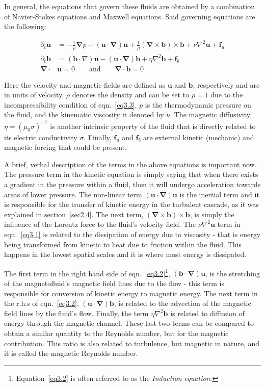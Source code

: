 \documentclass[12pt,a4paper]{report}
\begin{document}
In general, the equations that govern these fluids are obtained by a combination of Navier-Stokes equations and Maxwell equations. Said governing equations are the following:

\begin{align}
\partial_t \bm u &= - \frac{1}{\rho} \bm \nabla p - (\bm u \cdot \bm \nabla) \bm u + \frac{1}{\rho} (\bm \nabla \times \bm b) \times \bm b + \nu \nabla^2 \bm u + \bm f_u \label{eq3.1} \\
\partial_t \bm b &= (\bm b \cdot \nabla) \bm u - (\bm u \cdot \bm \nabla) \bm b + \eta \nabla^2 \bm b + \bm f_b \label{eq3.2} \\
\bm \nabla \cdot &\bm u = 0 \qquad \text{and} \qquad \bm \nabla \cdot \bm b = 0 \label{eq3.3}
\end{align}

Here the velocity and magnetic fields are defined as $\bm u$ and $\bm b$, respectively and are in units of velocity, $\rho$ denotes the density and can be set to $\rho = 1$ due to the incompressibility condition of eqn.~\ref{eq3.3}, $p$ is the thermodynamic pressure on the fluid, and the kinematic viscosity it denoted by $\nu$. The magnetic diffusivity $\eta=(\mu_0\sigma)^{-1}$ is another intrinsic property of the fluid that is directly related to its electric conductivity $\sigma$. Finally, $\bm f_u$ and $\bm f_b$ are external kinetic (mechanic) and magnetic forcing that could be present. 

A brief, verbal description of the terms in the above equations is important now. The pressure term in the kinetic equation is simply saying that when there exists a gradient in the pressure within a fluid, then it will undergo acceleration towards areas of lower pressure. The non-linear term $(\bm u \cdot \bm \nabla)\bm u$ is the inertial term and it is responsible for the transfer of kinetic energy in the turbulent cascade, as it was explained in section~\ref{sec2.4}. The next term, $(\bm \nabla \times \bm b) \times \bm b$, is simply the influence of the Lorentz force to the fluid's velocity field. The $\nu \nabla^2 \bm u$ term in eqn.~\ref{eq3.1} is related to the dissipation of energy due to viscosity - that is energy being transformed from kinetic to heat due to friction  within the fluid. This happens in the lowest spatial scales and it is where most energy is dissipated.

The first term in the right hand side of eqn.~\ref{eq3.2}\footnote{Equation~\ref{eq3.2} is often referred to as the \textit{Induction equation}.}, $(\bm b \cdot \bm \nabla)\bm u$, is the stretching of the magnetofluid's magnetic field lines due to the flow - this term is responsible for conversion of kinetic energy to magnetic energy. The next term in the r.h.s of eqn.~\ref{eq3.2}, $(\bm u \cdot \bm \nabla)\bm b$, is related to the advection of the magnetic field lines by the fluid's flow. Finally, the term $\eta \nabla^2 \bm b$ is related to diffusion of energy through the magnetic channel. These last two terms can be compared to obtain a similar quantity to the Reynolds number, but for the magnetic contribution. This ratio is also related to turbulence, but magnetic in nature, and it is called the magnetic Reynolds number. 
\end{document}
